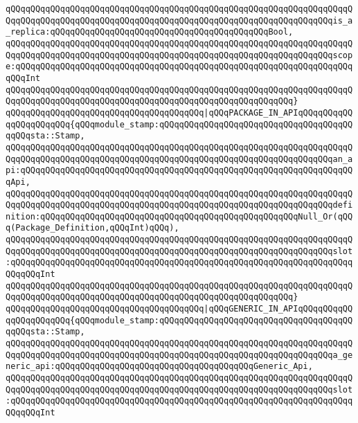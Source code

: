 \verb|qQQqqQQqqQQqqQQqqQQqqQQqqQQqqQQqqQQqqQQqqQQqqQQqqQQqqQQqqQQqqQQqqQQqqQQqqQQqqQQqqQQqqQQqqQQqqQQqqQQqqQQqqQQqqQQqqQQqqQQqqQQqqQQqqQQqqQQqis_a_replica:qQQqqQQqqQQqqQQqqQQqqQQqqQQqqQQqqQQqqQQqqQQqBool,|\newline
\verb|qQQqqQQqqQQqqQQqqQQqqQQqqQQqqQQqqQQqqQQqqQQqqQQqqQQqqQQqqQQqqQQqqQQqqQQqqQQqqQQqqQQqqQQqqQQqqQQqqQQqqQQqqQQqqQQqqQQqqQQqqQQqqQQqqQQqqQQqscope:qQQqqQQqqQQqqQQqqQQqqQQqqQQqqQQqqQQqqQQqqQQqqQQqqQQqqQQqqQQqqQQqqQQqqQQqInt|\newline
\verb|qQQqqQQqqQQqqQQqqQQqqQQqqQQqqQQqqQQqqQQqqQQqqQQqqQQqqQQqqQQqqQQqqQQqqQQqqQQqqQQqqQQqqQQqqQQqqQQqqQQqqQQqqQQqqQQqqQQqqQQqqQQqqQQq}|\newline
\verb|qQQqqQQqqQQqqQQqqQQqqQQqqQQqqQQqqQQqqQQq|\verb#|qQQqPACKAGE_IN_APIqQQqqQQqqQQqqQQqqQQqqQQq{qQQqmodule_stamp:qQQqqQQqqQQqqQQqqQQqqQQqqQQqqQQqqQQqqQQqqQQqsta::Stamp,#\newline
\verb|qQQqqQQqqQQqqQQqqQQqqQQqqQQqqQQqqQQqqQQqqQQqqQQqqQQqqQQqqQQqqQQqqQQqqQQqqQQqqQQqqQQqqQQqqQQqqQQqqQQqqQQqqQQqqQQqqQQqqQQqqQQqqQQqqQQqqQQqan_api:qQQqqQQqqQQqqQQqqQQqqQQqqQQqqQQqqQQqqQQqqQQqqQQqqQQqqQQqqQQqqQQqqQQqApi,|\newline
\verb|qQQqqQQqqQQqqQQqqQQqqQQqqQQqqQQqqQQqqQQqqQQqqQQqqQQqqQQqqQQqqQQqqQQqqQQqqQQqqQQqqQQqqQQqqQQqqQQqqQQqqQQqqQQqqQQqqQQqqQQqqQQqqQQqqQQqqQQqdefinition:qQQqqQQqqQQqqQQqqQQqqQQqqQQqqQQqqQQqqQQqqQQqqQQqqQQqNull_Or(qQQq(Package_Definition,qQQqInt)qQQq),|\newline
\verb|qQQqqQQqqQQqqQQqqQQqqQQqqQQqqQQqqQQqqQQqqQQqqQQqqQQqqQQqqQQqqQQqqQQqqQQqqQQqqQQqqQQqqQQqqQQqqQQqqQQqqQQqqQQqqQQqqQQqqQQqqQQqqQQqqQQqqQQqslot:qQQqqQQqqQQqqQQqqQQqqQQqqQQqqQQqqQQqqQQqqQQqqQQqqQQqqQQqqQQqqQQqqQQqqQQqqQQqInt|\newline
\verb|qQQqqQQqqQQqqQQqqQQqqQQqqQQqqQQqqQQqqQQqqQQqqQQqqQQqqQQqqQQqqQQqqQQqqQQqqQQqqQQqqQQqqQQqqQQqqQQqqQQqqQQqqQQqqQQqqQQqqQQqqQQqqQQq}|\newline
\verb|qQQqqQQqqQQqqQQqqQQqqQQqqQQqqQQqqQQqqQQq|\verb#|qQQqGENERIC_IN_APIqQQqqQQqqQQqqQQqqQQqqQQq{qQQqmodule_stamp:qQQqqQQqqQQqqQQqqQQqqQQqqQQqqQQqqQQqqQQqqQQqsta::Stamp,#\newline
\verb|qQQqqQQqqQQqqQQqqQQqqQQqqQQqqQQqqQQqqQQqqQQqqQQqqQQqqQQqqQQqqQQqqQQqqQQqqQQqqQQqqQQqqQQqqQQqqQQqqQQqqQQqqQQqqQQqqQQqqQQqqQQqqQQqqQQqqQQqa_generic_api:qQQqqQQqqQQqqQQqqQQqqQQqqQQqqQQqqQQqqQQqGeneric_Api,|\newline
\verb|qQQqqQQqqQQqqQQqqQQqqQQqqQQqqQQqqQQqqQQqqQQqqQQqqQQqqQQqqQQqqQQqqQQqqQQqqQQqqQQqqQQqqQQqqQQqqQQqqQQqqQQqqQQqqQQqqQQqqQQqqQQqqQQqqQQqqQQqslot:qQQqqQQqqQQqqQQqqQQqqQQqqQQqqQQqqQQqqQQqqQQqqQQqqQQqqQQqqQQqqQQqqQQqqQQqqQQqInt|\newline
